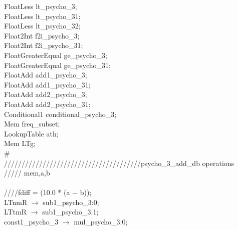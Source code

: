 {\hspace*{2em}FloatLess lt\_psycho\_3; \\
\hspace*{2em}FloatLess lt\_psycho\_31; \\
\hspace*{2em}FloatLess lt\_psycho\_32; \\
\hspace*{2em}Float2Int f2i\_psycho\_3; \\
\hspace*{2em}Float2Int f2i\_psycho\_31; \\
\hspace*{2em}FloatGreaterEqual ge\_psycho\_3; \\
\hspace*{2em}FloatGreaterEqual ge\_psycho\_31; \\
\hspace*{2em}FloatAdd add1\_psycho\_3; \\
\hspace*{2em}FloatAdd add1\_psycho\_31; \\
\hspace*{2em}FloatAdd add2\_psycho\_3; \\
\hspace*{2em}FloatAdd add2\_psycho\_31; \\
\hspace*{2em}Conditional1 conditional\_psycho\_3; \\
\hspace*{2em}Mem freq\_subset; \\
\hspace*{2em}LookupTable ath; \\
\hspace*{2em}Mem LTg; \\
\# \\
\hspace*{2em}///////////////////////////////////////psycho\_3\_add\_db operations \\
\hspace*{2em}///// mem,a,b \\
   \\
   \hspace*{2em}////fdiff = (10.0 * (a $-$ b)); \\
   \hspace*{2em}LTnmR $\rightarrow$ sub1\_psycho\_3:0; \\
   \hspace*{2em}LTtmR $\rightarrow$ sub1\_psycho\_3:1; \\
   \hspace*{2em}const1\_psycho\_3 $\rightarrow$ mul\_psycho\_3:0; \\
}
